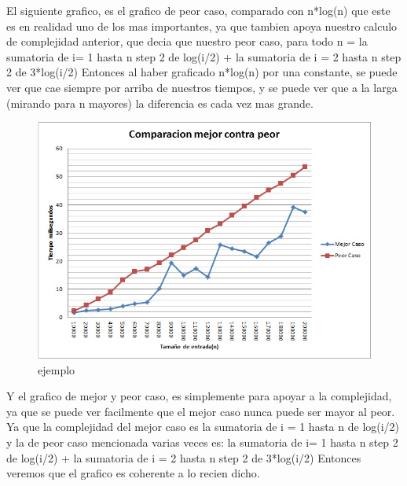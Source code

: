 El siguiente grafico, es el grafico de peor caso, comparado con n*log(n) que este es en realidad uno de los mas importantes, ya que tambien apoya nuestro calculo
de complejidad anterior, que decia que nuestro peor caso, para todo n = la sumatoria de i= 1 hasta n step 2 de log(i/2) + la sumatoria de i = 2 hasta n step 2 de 3*log(i/2)
Entonces al haber graficado n*log(n) por una constante, se puede ver que cae siempre por arriba de nuestros tiempos, y se puede ver que a la larga (mirando para n mayores)
la diferencia es cada vez mas grande.

\begin{figure}[H]
  \begin{center}
      \includegraphics[scale=0.50]{imagenes/ComparacionEj2.jpg}
  \end{center}
  \caption{ejemplo}
\end{figure}

Y el grafico de mejor y peor caso, es simplemente para apoyar a la complejidad, ya que se puede ver facilmente que el mejor caso nunca puede ser mayor al peor.
Ya que la complejidad del mejor caso es la sumatoria de i = 1 hasta n de log(i/2) y la de peor caso mencionada varias veces es: la sumatoria de i= 1 hasta n step 2 de log(i/2) + la sumatoria de i = 2 hasta n step 2 de 3*log(i/2)
Entonces veremos que el grafico es coherente a lo recien dicho.



